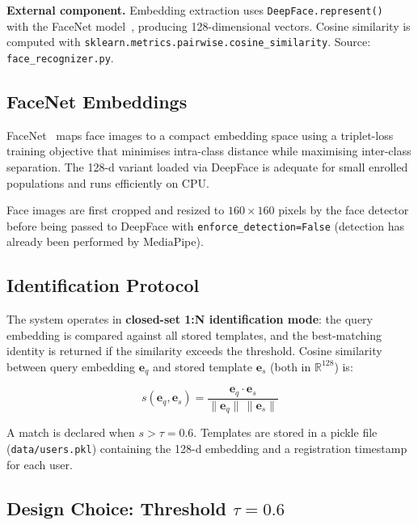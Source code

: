 \documentclass[11pt,a4paper]{article}
\begin{document}
\begin{externalbox}
  \textbf{External component.}
  Embedding extraction uses \texttt{DeepFace.represent()}~\cite{serengil2021lightface}
  with the FaceNet model~\cite{schroff2015facenet}, producing 128-dimensional vectors.
  Cosine similarity is computed with \texttt{sklearn.metrics.\allowbreak{}pairwise.\allowbreak{}cosine\_similarity}.
  Source: \texttt{face\_recognizer.py}.
\end{externalbox}

\subsection{FaceNet Embeddings}

FaceNet~\cite{schroff2015facenet} maps face images to a compact embedding space
using a triplet-loss training objective that minimises intra-class distance while
maximising inter-class separation.
The 128-d variant loaded via DeepFace is adequate for small enrolled populations
and runs efficiently on CPU.

Face images are first cropped and resized to $160 \times 160$ pixels by the
face detector before being passed to DeepFace with \texttt{enforce\_detection=False}
(detection has already been performed by MediaPipe).

\subsection{Identification Protocol}

The system operates in \textbf{closed-set 1:N identification mode}: the query
embedding is compared against all stored templates, and the best-matching identity
is returned if the similarity exceeds the threshold.
Cosine similarity between query embedding $\mathbf{e}_q$ and stored template
$\mathbf{e}_s$ (both in $\mathbb{R}^{128}$) is:

\begin{equation}
  s(\mathbf{e}_q,\mathbf{e}_s) = \frac{\mathbf{e}_q \cdot \mathbf{e}_s}{\|\mathbf{e}_q\|\,\|\mathbf{e}_s\|}
  \label{eq:cosine}
\end{equation}

A match is declared when $s > \tau = 0.6$.
Templates are stored in a pickle file (\texttt{data/users.pkl}) containing the
128-d embedding and a registration timestamp for each user.

\subsection{Design Choice: Threshold $\tau = 0.6$}
\end{document}
